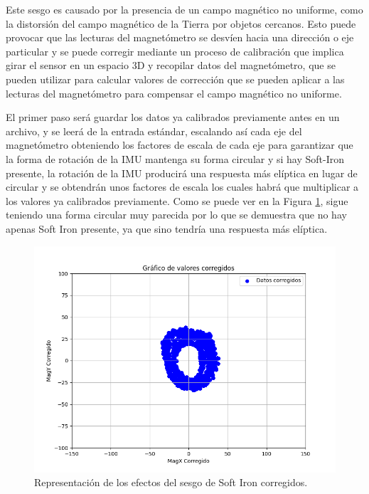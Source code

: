 Este sesgo es causado por la presencia de un campo magnético no uniforme, como la distorsión del campo magnético de la Tierra por objetos cercanos. Esto puede provocar que las lecturas del magnetómetro se desvíen hacia una dirección o eje particular y se puede corregir mediante un proceso de calibración que implica girar el sensor en un espacio 3D y recopilar datos del magnetómetro, que se pueden utilizar para calcular valores de corrección que se pueden aplicar a las lecturas del magnetómetro para compensar el campo magnético no uniforme.

El primer paso será guardar los datos ya calibrados previamente antes en un archivo, y se leerá de la entrada estándar, escalando así cada eje del magnetómetro obteniendo los factores de escala de cada eje para garantizar que la forma de rotación de la IMU mantenga su forma circular y si hay Soft-Iron presente, la rotación de la IMU producirá una respuesta más elíptica en lugar de circular y se obtendrán unos factores de escala los cuales habrá que multiplicar a los valores ya calibrados previamente. Como se puede ver en la Figura \ref{fig:softiron}, sigue teniendo una forma circular muy parecida por lo que se demuestra que no hay apenas Soft Iron presente, ya que sino tendría una respuesta más elíptica.

\begin{figure}[H]
  \centering
  \includegraphics[scale=0.6]{figs/soft_iron_calibration} %
  \caption{ Representación de los efectos del sesgo de Soft Iron corregidos.}
  \label{fig:softiron}
\end{figure} 

